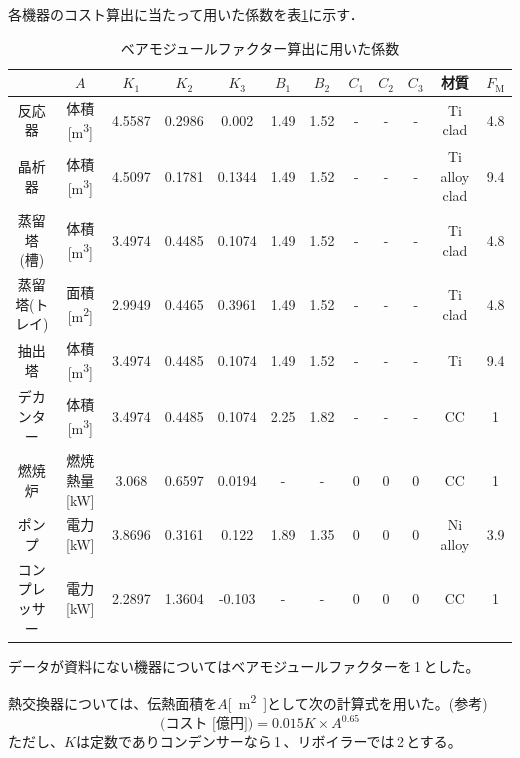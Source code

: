 \documentclass[a4j]{jsreport}
\begin{document}
各機器のコスト算出に当たって用いた係数を表\ref{BM係数}に示す．
\begin{table}[htbp]
    \caption{ベアモジュールファクター算出に用いた係数}
    \label{BM係数}
    \begin{tabular}{cccccccccccc}\hline
    &$A$ & $K_1$     & $K_2$     & $K_3$     & $B_1$   & $B_2$   &$C_1$&$C_2$&$C_3$& 材質 & $F_\mathrm{M}$  \\\hline
    反応器  & 体積[\si{\cubic\metre}]  & 4.5587 & 0.2986 & 0.002  & 1.49 & 1.52 &-&-&-& Ti clad       & 4.8 \\
    晶析器   & 体積[\si{\cubic\metre}] & 4.5097 & 0.1781 & 0.1344 & 1.49 & 1.52 &-&-&-& Ti alloy clad & 9.4 \\
    蒸留塔(槽)&  体積[\si{\cubic\metre}]   & 3.4974 & 0.4485 & 0.1074 & 1.49 & 1.52 &-&-&-& Ti clad    & 4.8 \\
    蒸留塔(トレイ)& 面積[\si{\square\metre}] & 2.9949 & 0.4465 & 0.3961 & 1.49 & 1.52 &-&-&-& Ti clad   & 4.8 \\
    抽出塔   & 体積[\si{\cubic\metre}] & 3.4974 & 0.4485 & 0.1074 & 1.49 & 1.52 &-&-&-& Ti            & 9.4 \\
    デカンター&  体積[\si{\cubic\metre}] & 3.4974 & 0.4485 & 0.1074 & 2.25 & 1.82 &-&-&-& CC            & 1   \\
    燃焼炉   & 燃焼熱量[\si{\kilo \watt}] & 3.068  & 0.6597 & 0.0194 & -    & -    &0&0&0& CC             & 1   \\
    ポンプ   & 電力[\si{\kilo\watt}] & 3.8696 & 0.3161 & 0.122  & 1.89 & 1.35 &0&0&0& Ni alloy      & 3.9 \\
    コンプレッサー& 電力[\si{\kilo\watt}] & 2.2897 & 1.3604 & -0.103 & -    & -    &0&0&0& CC            & 1  \\\hline
    \end{tabular}
\end{table}
データが資料にない機器についてはベアモジュールファクターを\,1\,とした。\par
熱交換器については、伝熱面積を$A$\si{[\square\metre]}として次の計算式を用いた。(参考\cite{謎資料})
\begin{equation}
    \text{(コスト [億円])} = 0.015K\times A^{0.65}
\end{equation}
ただし、$K$は定数でありコンデンサーなら\,1\,、リボイラーでは\,2\,とする。
\end{document}
